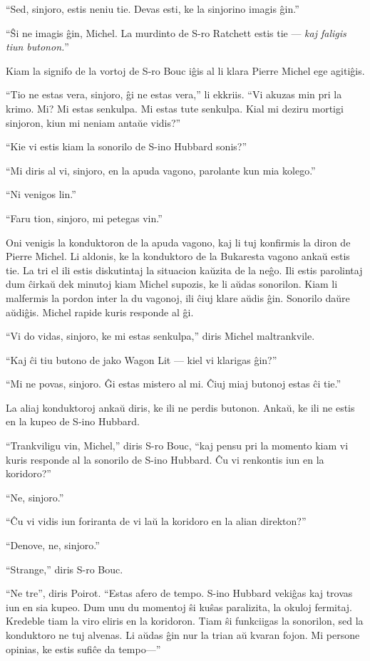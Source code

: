 ``Sed, sinjoro, estis neniu tie. Devas esti, ke la sinjorino imagis ĝin.''

``Ŝi ne imagis ĝin, Michel. La murdinto de S-ro Ratchett estis tie --- \emph{kaj faligis tiun butonon.}''

Kiam la signifo de la vortoj de S-ro Bouc iĝis al li klara Pierre Michel ege agitiĝis.

``Tio ne estas vera, sinjoro, ĝi ne estas vera,'' li ekkriis. ``Vi akuzas min pri la krimo. Mi? Mi estas senkulpa. Mi estas tute senkulpa. Kial mi deziru mortigi sinjoron, kiun mi neniam antaŭe vidis?''

``Kie vi estis kiam la sonorilo de S-ino Hubbard sonis?''

``Mi diris al vi, sinjoro, en la apuda vagono, parolante kun mia kolego.''

``Ni venigos lin.''

``Faru tion, sinjoro, mi petegas vin.''

Oni venigis la konduktoron de la apuda vagono, kaj li tuj konfirmis la diron de Pierre Michel. Li aldonis, ke la konduktoro de la Bukaresta vagono ankaŭ estis tie. La tri el ili estis diskutintaj la situacion kaŭzita de la neĝo. Ili estis parolintaj dum ĉirkaŭ dek minutoj kiam Michel supozis, ke li aŭdas sonorilon. Kiam li malfermis la pordon inter la du vagonoj, ili ĉiuj klare aŭdis ĝin. Sonorilo daŭre aŭdiĝis. Michel rapide kuris responde al ĝi.

``Vi do vidas, sinjoro, ke mi estas senkulpa,'' diris Michel maltrankvile.

``Kaj ĉi tiu butono de jako Wagon Lit --- kiel vi klarigas ĝin?''

``Mi ne povas, sinjoro. Ĝi estas mistero al mi. Ĉiuj miaj butonoj estas ĉi tie.''

La aliaj konduktoroj ankaŭ diris, ke ili ne perdis butonon. Ankaŭ, ke ili ne estis en la kupeo de S-ino Hubbard.

``Trankviligu vin, Michel,'' diris S-ro Bouc, ``kaj pensu pri la momento kiam vi kuris responde al la sonorilo de S-ino Hubbard. Ĉu vi renkontis iun en la koridoro?''

``Ne, sinjoro.''

``Ĉu vi vidis iun foriranta de vi laŭ la koridoro en la alian direkton?''

``Denove, ne, sinjoro.''

``Strange,'' diris S-ro Bouc.

``Ne tre'', diris Poirot. ``Estas afero de tempo. S-ino Hubbard vekiĝas kaj trovas iun en sia kupeo. Dum unu du momentoj ŝi kuŝas paralizita, la okuloj fermitaj. Kredeble tiam la viro eliris en la koridoron. Tiam ŝi funkciigas la sonorilon, sed la konduktoro ne tuj alvenas. Li aŭdas ĝin nur la trian aŭ kvaran fojon. Mi persone opinias, ke estis sufiĉe da tempo---''

